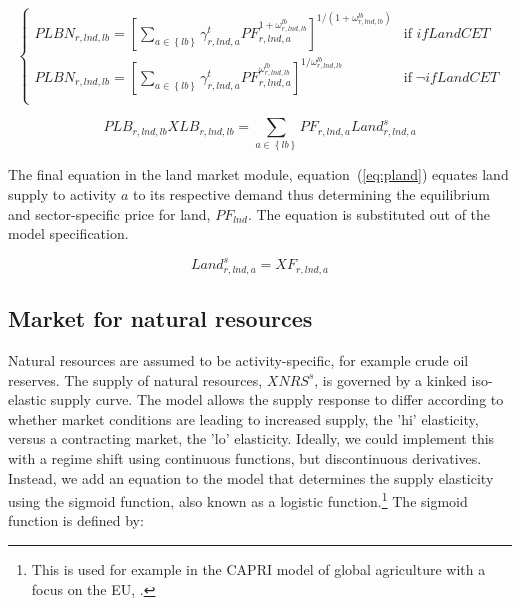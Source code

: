 \documentclass[11pt,letterpaper]{report}
\begin{document}
\begin{equation}
\label{eq:plbn}
\begin{cases}
   \mathit{PLBN}_{r,\mathit{lnd},\mathit{lb}} =
      \displaystyle \left[ \sum_{a \in \left\{ \mathit{lb} \right\} } {
         \gamma^{t}_{r,\mathit{lnd},a}
         \mathit{PF}_{r,\mathit{lnd},a}^{1+\omega^{\mathit{lb}}_{r,\mathit{lnd},\mathit{lb}}}
      } \right]^{{1}/{(1+\omega^{\mathit{lb}}_{r,\mathit{lnd},\mathit{lb}})}}
   & \textrm{if } \mathit{ifLandCET} \\
   \mathit{PLBN}_{r,\mathit{lnd},\mathit{lb}} =
      \displaystyle \left[ \sum_{a \in \left\{ \mathit{lb} \right\} } {
         \gamma^{t}_{r,\mathit{lnd},a}
         \mathit{PF}_{r,\mathit{lnd},a}^{\omega^{\mathit{lb}}_{r,\mathit{lnd},\mathit{lb}}}
      } \right]^{{1}/{\omega^{\mathit{lb}}_{r,\mathit{lnd},\mathit{lb}}}}
   & \textrm{if} \; \neg \mathit{ifLandCET} \\
\end{cases}
\end{equation}

\begin{equation}
\label{eq:plb}
\mathit{PLB}_{r,\mathit{lnd},\mathit{lb}} \mathit{XLB}_{r,\mathit{lnd},\mathit{lb}} =
   \displaystyle \sum_{a \in \left\{ \mathit{lb} \right\} } {
      \mathit{PF}_{r,\mathit{lnd},a} \mathit{Land}^s_{r,\mathit{lnd},a}
   }
\end{equation}

The final equation in the land market module, equation~(\ref{eq:pland}) equates
land supply to activity $a$ to its respective demand thus determining the
equilibrium and sector-specific price for land, $\mathit{PF}_{\mathit{lnd}}$.
The equation is substituted out of the model specification.

\begin{equation}
\label{eq:pland}
\mathit{Land}^s_{r,\mathit{lnd},a} = \mathit{XF}_{r,\mathit{lnd},a}
\end{equation}

\subsection{Market for natural resources}

Natural resources are assumed to be activity-specific, for example crude oil
reserves. The supply of natural resources, $\mathit{XNRS^s}$, is governed by a
kinked iso-elastic supply curve. The model allows the supply response to differ
according to whether market conditions are leading to increased supply, the 'hi'
elasticity, versus a contracting market, the 'lo' elasticity. Ideally, we could
implement this with a regime shift using continuous functions, but discontinuous
derivatives. Instead, we add an equation to the model that determines the supply
elasticity using the sigmoid function, also known as a logistic
function.\footnote{This is used for example in the CAPRI model of global
agriculture with a focus on the EU, \cite{Britzetal2007}.} The sigmoid function
is defined by:
\end{document}
